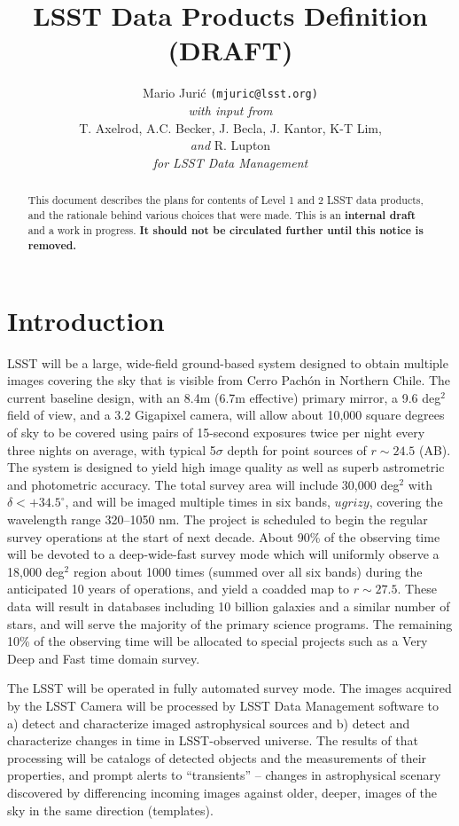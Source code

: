 \documentclass[12pt]{article}
\title{LSST Data Products Definition (DRAFT)}
\author{
    Mario Juri\'c \texttt{(mjuric@lsst.org)} \vspace{1ex} \\
    {\em with input from} \vspace{1ex} \\
    T. Axelrod, A.C. Becker, J. Becla,  J. Kantor, K-T Lim,\\
    {\em and} R. Lupton \vspace{1.2ex} \\
    {\em for LSST Data Management}
}
\newcommand{\B}[1]{{#1}}
\newcommand{\R}[1]{{\color{red}}}
\begin{document}
\maketitle

\begin{abstract}
This document describes the plans for contents of Level 1 and 2 LSST data products, and the rationale behind various choices that were made. This is an {\bf internal draft} and a work in progress. {\bf It should not be circulated further until this notice is removed.}
\end{abstract}

\tableofcontents

\section{Introduction}

LSST will be a large, wide-field ground-based system
designed to obtain multiple images covering the sky that is visible from Cerro Pach\'{o}n in Northern Chile. The current baseline design, with an 8.4m (6.7m effective) primary mirror, a 9.6 deg$^2$ field of view, and a 3.2 Gigapixel camera, will allow about 10,000 square degrees of sky to be covered using pairs  of 15-second exposures \R{in two photometric bands} \B{twice per night} every three nights on average, with typical 5$\sigma$ depth for point sources of $r\sim24.5$ (AB). The system is designed to yield high image quality as well as superb astrometric  and photometric accuracy. The \B{total} survey area will include 30,000 deg$^2$ with $\delta<+34.5^\circ$, and will be imaged multiple times in six bands, $ugrizy$, covering the wavelength range 320--1050 nm. The project is scheduled to  begin the regular survey operations at the start of next decade. About 90\% of the observing time will be devoted to a deep-wide-fast survey mode which will \B{uniformly} observe a 18,000 deg$^2$ region about 1000 times (summed over all six bands) during the anticipated 10 years of operations, and yield a coadded map to $r\sim27.5$. These data will result in databases including 10 billion galaxies and a similar number of stars, and will serve the majority of the primary science programs. The remaining 10\% of the observing time will be allocated to special projects such as a Very Deep and Fast time domain survey.

The LSST will be operated in fully automated survey mode. The images acquired by the LSST Camera will be processed by LSST Data Management software to a) detect and characterize imaged astrophysical sources and b) detect and characterize changes in time in LSST-observed universe. The results of that processing will be catalogs of detected objects and the measurements of their properties, and prompt alerts to ``transients'' -- changes in astrophysical scenary discovered by differencing incoming images against older, deeper, images of the sky in the same direction (templates).
\end{document}
